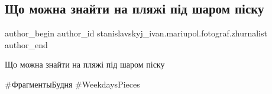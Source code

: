  
 
 
 
 

\subsection{Що можна знайти на пляжі під шаром піску}
\label{sec:20_05_2021.fb.stanislavskyj_ivan.mariupol.fotograf.zhurnalist.1.pljazh_mashyna}

\ifcmt
 author_begin
   author_id stanislavskyj_ivan.mariupol.fotograf.zhurnalist
 author_end
\fi

Що можна знайти на пляжі під шаром піску

\#ФрагментыБудня \#WeekdaysPieces

